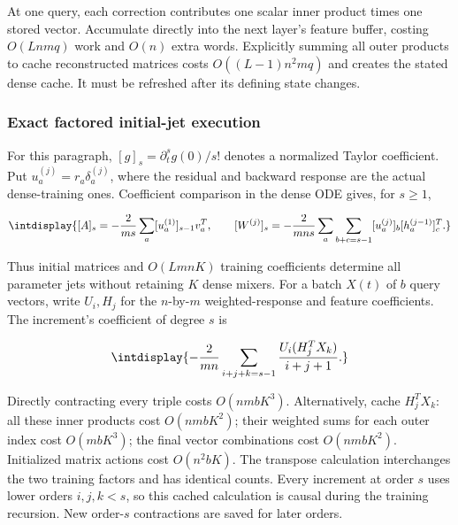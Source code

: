 
At one query, each correction contributes one scalar inner product times one stored vector. Accumulate directly into the next layer's feature buffer, costing \(O(Lnmq)\) work and \(O(n)\) extra words. Explicitly summing all outer products to cache reconstructed matrices costs \(O((L-1)n^2mq)\) and creates the stated dense cache. It must be refreshed after its defining state changes.


\subsubsection{Exact factored initial-jet execution}



For this paragraph, \([g]_s=\partial_t^sg(0)/s!\) denotes a normalized Taylor coefficient. Put \(u_a^{(j)}=r_a\delta_a^{(j)}\), where the residual and backward response are the actual dense-training ones. Coefficient comparison in the dense ODE gives, for \(s\ge1\),


\begingroup\renewcommand{\theHequation}{intdisplay.828}
\begin{equation}
\intdisplay{
[A]_s=-\frac2{ms}\sum_a[u_a^{(1)}]_{s-1}v_a^T,\qquad
[W^{(j)}]_s=-\frac2{mns}
 \sum_a\sum_{b+c=s-1}[u_a^{(j)}]_b[h_a^{(j-1)}]_c^T.
}
\label{int:eq-0405-cost-factored-weight-jets}
\end{equation}
\endgroup


Thus initial matrices and \(O(LmnK)\) training coefficients determine all parameter jets without retaining \(K\) dense mixers. For a batch \(X(t)\) of \(b\) query vectors, write \(U_i,\allowbreak H_j\) for the \(n\)-by-\(m\) weighted-response and feature coefficients. The increment's coefficient of degree \(s\) is


\begingroup\renewcommand{\theHequation}{intdisplay.829}
\begin{equation}
\intdisplay{
-\frac2{mn}\sum_{i+j+k=s-1}
 \frac{U_i(H_j^TX_k)}{i+j+1}.
}
\label{int:eq-0406-cost-factored-query-action}
\end{equation}
\endgroup


Directly contracting every triple costs \(O(nmbK^3)\). Alternatively, cache \(H_j^TX_k\): all these inner products cost \(O(nmbK^2)\); their weighted sums for each outer index cost \(O(mbK^3)\); the final vector combinations cost \(O(nmbK^2)\). Initialized matrix actions cost \(O(n^2bK)\). The transpose calculation interchanges the two training factors and has identical counts. Every increment at order \(s\) uses lower orders \(i,\allowbreak j,\allowbreak k<s\), so this cached calculation is causal during the training recursion. New order-\(s\) contractions are saved for later orders.


